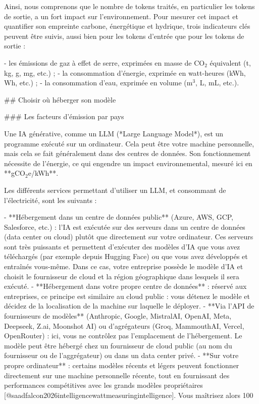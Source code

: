 Ainsi, nous comprenons que le nombre de tokens traités, en particulier les tokens de sortie, a un fort impact sur l'environnement.
Pour mesurer cet impact et quantifier son empreinte carbone, énergétique et hydrique, trois indicateurs clés peuvent être suivis, aussi bien pour les tokens d'entrée que pour les tokens de sortie :

- les émissions de gaz à effet de serre, exprimées en masse de CO$_2$ équivalent (t, kg, g, mg, etc.) ;
- la consommation d'énergie, exprimée en watt-heures (kWh, Wh, etc.) ;
- la consommation d'eau, exprimée en volume (m$^3$, L, mL, etc.).

## Choisir où héberger son modèle

### Les facteurs d'émission par pays

Une IA générative, comme un LLM (*Large Language Model*), est un programme exécuté sur un ordinateur. Cela peut être votre machine personnelle, mais cela se fait généralement dans des centres de données. Son fonctionnement nécessite de l'énergie, ce qui engendre un impact environnemental, mesuré ici en **gCO$_2$e/kWh**.

Les différents services permettant d'utiliser un LLM, et consommant de l'électricité, sont les suivants :

- **Hébergement dans un centre de données public** (Azure, AWS, GCP, Salesforce, etc.) : l'IA est exécutée sur des serveurs dans un centre de données (data center ou cloud) plutôt que directement sur votre ordinateur. Ces serveurs sont très puissants et permettent d'exécuter des modèles d'IA que vous avez téléchargés (par exemple depuis Hugging Face) ou que vous avez développés et entraînés vous-même. Dans ce cas, votre entreprise possède le modèle d'IA et choisit le fournisseur de cloud et la région géographique dans lesquels il sera exécuté.
- **Hébergement dans votre propre centre de données** : réservé aux entreprises, ce principe est similaire au cloud public : vous détenez le modèle et décidez de la localisation de la machine sur laquelle le déployer.
- **Via l'API de fournisseurs de modèles** (Anthropic, Google, MistralAI, OpenAI, Meta, Deepseek, Z.ai, Moonshot AI) ou d'agrégateurs (Groq, MammouthAI, Vercel, OpenRouter) : ici, vous ne contrôlez pas l'emplacement de l'hébergement. Le modèle peut être hébergé chez un fournisseur de cloud public (au nom du fournisseur ou de l'aggrégateur) ou dans un data center privé.
- **Sur votre propre ordinateur** : certains modèles récents et légers peuvent fonctionner directement sur une machine personnelle récente, tout en fournissant des performances compétitives avec les grands modèles propriétaires [@saadfalcon2026intelligencewattmeasuringintelligence]. Vous maîtrisez alors 100 %

